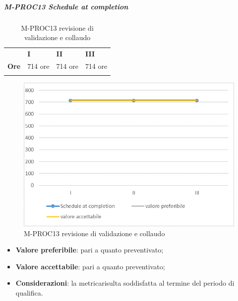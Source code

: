 \subparagraph{M-PROC13 Schedule at completion} \mbox{}
\begin{longtable}[H!] {						
		>{}p{15mm}  		
		>{}p{16mm}
		>{}p{16mm}		
		>{}p{16mm}		
	}
	\rowcolor{gray!50}
	\textbf{} & \textbf{I} & \textbf{II} & \textbf{III}  \TBstrut \\ [2mm]
	\textbf{Ore} & 714 ore & 714 ore & 714 ore  \TBstrut \\ [2mm]
	\rowcolor{white}
	\caption{M-PROC13 revisione di validazione e collaudo}
\end{longtable}
\begin{figure}[H] 	
	\includegraphics[width=\linewidth]{./img/grafici/RA13.png}	
	\caption{M-PROC13 revisione di validazione e collaudo}	
\end{figure}
\begin{itemize}
	\item \textbf{Valore preferibile}: pari a quanto preventivato;
	\item \textbf{Valore accettabile}: pari a quanto preventivato;
	\item \textbf{Considerazioni}: la metrica\glosp risulta soddisfatta al termine del periodo di qualifica.
\end{itemize}

